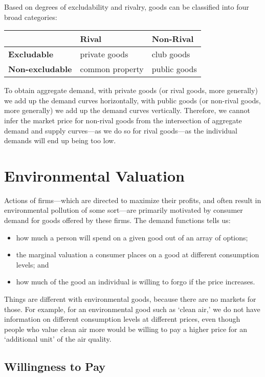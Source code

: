 \documentclass[
]{book}
\providecommand{\tightlist}{%
  \setlength{\itemsep}{0pt}\setlength{\parskip}{0pt}}
\begin{document}
Based on degrees of excludability and rivalry, goods can be classified into four broad categories:

\begin{longtable}[]{@{}lll@{}}
\toprule
& \textbf{Rival} & \textbf{Non-Rival}\tabularnewline
\midrule
\endhead
\textbf{Excludable} & private goods & club goods\tabularnewline
\textbf{Non-excludable} & common property & public goods\tabularnewline
\bottomrule
\end{longtable}

To obtain aggregate demand, with private goods (or rival goods, more generally) we add up the demand curves horizontally, with public goods (or non-rival goods, more generally) we add up the demand curves vertically. Therefore, we cannot infer the market price for non-rival goods from the intersection of aggregate demand and supply curves---as we do so for rival goods---as the individual demands will end up being too low.

\hypertarget{environmental-valuation}{%
\chapter{Environmental Valuation}\label{environmental-valuation}}

Actions of firms---which are directed to maximize their profits, and often result in environmental pollution of some sort---are primarily motivated by consumer demand for goods offered by these firms. The demand functions tells us:

\begin{itemize}
\tightlist
\item
  how much a person will spend on a given good out of an array of options;
\item
  the marginal valuation a consumer places on a good at different consumption levels; and
\item
  how much of the good an individual is willing to forgo if the price increases.
\end{itemize}

Things are different with environmental goods, because there are no markets for those. For example, for an environmental good such as `clean air,' we do not have information on different consumption levels at different prices, even though people who value clean air more would be willing to pay a higher price for an `additional unit' of the air quality.

\hypertarget{willingness-to-pay}{%
\section{Willingness to Pay}\label{willingness-to-pay}}
\end{document}
